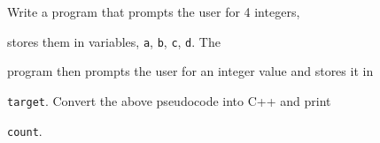 Write a program that prompts the user for 4 integers,

stores them in variables, \texttt{a}, \texttt{b}, \texttt{c}, \texttt{d}. The

program then prompts the user for an integer value and stores it in

\texttt{target}. Convert the above pseudocode into C++ and print

\texttt{count}.

